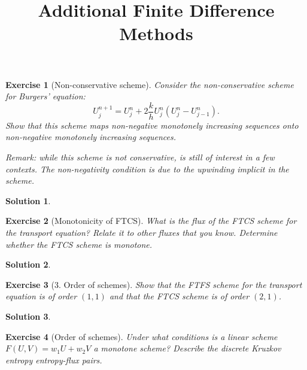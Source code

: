 \documentclass[10pt,letterpaper]{article}
\theoremstyle{break}
\newtheorem{exercise}{Exercise}
\newtheorem{mysolution}{Solution}
\newenvironment{solution}{\begin{mysolution}}{\end{mysolution}}
\begin{document}
\title{Additional Finite Difference Methods}
\date{}

\maketitle





\begin{exercise}[Non-conservative scheme]
	Consider the non-conservative scheme for Burgers' equation:
	\begin{equation}
		U^{n+1}_j = 	U^{n}_j +  	2 \frac{k}{h} U^{n}_j \left( 	U^{n}_j - U^{n}_{j-1} \right).
	\end{equation}
	Show that this scheme maps non-negative monotonely increasing sequences onto non-negative monotonely increasing sequences. 

	\textit{Remark: while this scheme is not conservative, is still of interest in a few contexts. The non-negativity condition is due to the upwinding implicit in the scheme.}
\end{exercise}

\begin{solution}

\end{solution}


\begin{exercise}[Monotonicity of FTCS]
	What is the flux of the FTCS scheme for the transport equation? Relate it to other fluxes that you know. Determine whether the FTCS scheme is monotone.
\end{exercise}

\begin{solution}

\end{solution}








\begin{exercise}[3. Order of schemes]
	Show that the FTFS scheme for the transport equation is of order $(1,1)$ and that the FTCS scheme is of order $(2,1)$.
\end{exercise}

\begin{solution}

\end{solution}





\begin{exercise}[Order of schemes]
	Under what conditions is a linear scheme $F(U,V) = w_1 U + w_2 V$ a monotone scheme?
	Describe the discrete Kruzkov entropy entropy-flux pairs.
\end{exercise}
\end{document}

